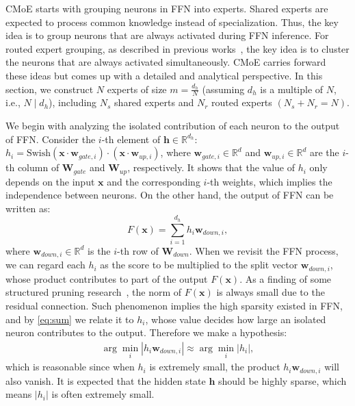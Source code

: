 CMoE starts with grouping neurons in FFN into experts.
Shared experts are expected to process common knowledge instead of specialization. Thus, the key idea is to group neurons that are always activated during FFN inference.
For routed expert grouping, as described in previous works~\cite{zhang2021moefication}, the key idea is to cluster the neurons that are always activated simultaneously.
CMoE carries forward these ideas but comes up with a detailed and analytical perspective.
In this section, we construct $N$ experts of size $m = \frac{d_h}{N}$ (assuming $d_h$ is a multiple of $N$, i.e., $N \mid d_h$), including $N_s$ shared experts and $N_r$ routed experts $(N_s + N_r = N)$.

We begin with analyzing the isolated contribution of each neuron to the output of FFN.
Consider the $i$-th element of $\mathbf{h} \in \mathbb{R}^{d_h}$:
    $h_i = \text{Swish}(\mathbf{x} \cdot \mathbf{w}_{gate,i})\cdot  (\mathbf{x}\cdot\mathbf{w}_{up,i})$,
where $\mathbf{w}_{gate,i} \in \mathbb{R}^{d}$ and $\mathbf{w}_{up,i} \in \mathbb{R}^{d}$ are the $i$-th column of $\mathbf{W}_{gate}$ and $\mathbf{W}_{up}$, respectively.
It shows that the value of $h_i$ only depends on the input $\mathbf{x}$ and the corresponding $i$-th weights, which implies the independence between neurons.
On the other hand, the output of FFN can be written as:
\begin{equation}
\label{eq:sum}
    F(\mathbf{x}) = \sum_{i=1}^{d_h} h_i \mathbf{w}_{down,i},
\end{equation}
where $\mathbf{w}_{down,i} \in \mathbb{R}^{d}$ is the $i$-th row of $\mathbf{W}_{down}$.
When we revisit the FFN process, we can regard each $h_i$ as the score to be multiplied to the split vector $\mathbf{w}_{down,i}$, whose product contributes to part of the output $F(\mathbf{x})$. 
As a finding of some structured pruning research~\cite{song2024sleb,chen2024compressing}, the norm of $F(\mathbf{x})$ is always small due to the residual connection. Such phenomenon implies the high sparsity existed in FFN, and by \eqref{eq:sum} we relate it to $h_i$, whose value decides how large an isolated neuron contributes to the output.
Therefore we make a hypothesis:
\begin{align}
\label{eq:hypo}
    \arg\min_i |h_i \mathbf{w}_{down,i}| \approx \arg\min_i |h_i|,
\end{align}
which is reasonable since when $h_i$ is extremely small, the product $h_i \mathbf{w}_{down,i}$ will also vanish.
It is expected that the hidden state $\mathbf{h}$ should be highly sparse, which means $|h_i|$ is often extremely small.
